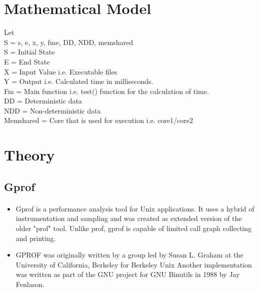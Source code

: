 \documentclass[a4paper,12pt]{article}
\begin{document}
\section{Mathematical Model} 
	 Let 	 	 																	\\
	 S 	= 	{s, e, x, y, fme, DD, NDD, memshared} 									\\
	 S 	= 	Initial State 															\\
	 E 	= 	End State 																\\
	 X	= 	Input Value i.e. Executable files 										\\
	 Y	= 	Output i.e. Calculated time in milliseconds. 							\\
	 Fm 	= 	Main function i.e. test() function for the calculation of time. 	\\
	 DD 	= 	Deterministic data 													\\
	 NDD 	= 	Non-deterministic data 												\\
	 Memshared 	= 	Core that is used for execution i.e. core1/core2 				\\
	 
	
\section{Theory}
	\subsection{Gprof}
		\paragraph{} 
		\begin{itemize}
		\item Gprof is a performance analysis tool for Unix applications. It uses a hybrid of instrumentation and  sampling and was created as extended version of the older "prof" tool. Unlike prof, gprof is capable of limited call graph collecting and printing.\\
		\item GPROF was originally written by a group led by Susan L. Graham at the University of California, Berkeley for Berkeley Unix  Another implementation was written as part of the GNU project for GNU Binutils in 1988 by Jay Fenlason.
		\end{itemize}
\end{document}
